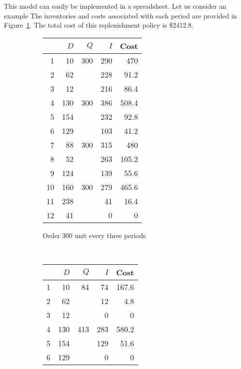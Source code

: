 \begin{solution}
This model can easily be implemented in a spreadsheet. Let us consider an example The inventories and costs associated with each period are provided in Figure~\ref{fig:3300}. The total cost of this replenishment policy is \$2412.8.

\begin{figure}[htbp]
\begin{subfigure}[b]{0.5\textwidth}
  \centering
    \begin{tabular}{rrrrr}
    \toprule
          & $D$ & $Q$ & $I$ & Cost \\
	\midrule
    1     & 10    & 300   & 290   & 470 \\
    2     & 62    &       & 228   & 91.2 \\
    3     & 12    &       & 216   & 86.4 \\
    4     & 130   & 300   & 386   & 508.4 \\
    5     & 154   &       & 232   & 92.8 \\
    6     & 129   &       & 103   & 41.2 \\
    7     & 88    & 300   & 315   & 480 \\
    8     & 52    &       & 263   & 105.2 \\
    9     & 124   &       & 139   & 55.6 \\
    10    & 160   & 300   & 279   & 465.6 \\
    11    & 238   &       & 41    & 16.4 \\
    12    & 41    &       & 0     & 0 \\
    \bottomrule
    \end{tabular}%
\caption{Order 300 unit every three periods}
\label{fig:3300}
\end{subfigure}
~
\begin{subfigure}[b]{0.5\textwidth}
  \centering
    \begin{tabular}{rrrrr}
    \toprule
          & $D$ & $Q$ & $I$ & Cost \\
	\midrule
    1     & 10    & 84    & 74    & 167.6 \\
    2     & 62    &       & 12    & 4.8 \\
    3     & 12    &       & 0     & 0 \\
    4     & 130   & 413   & 283   & 580.2 \\
    5     & 154   &       & 129   & 51.6 \\
    6     & 129   &       & 0     & 0 \\

\end{tabular}
\end{subfigure}
\end{figure}
\end{solution}
